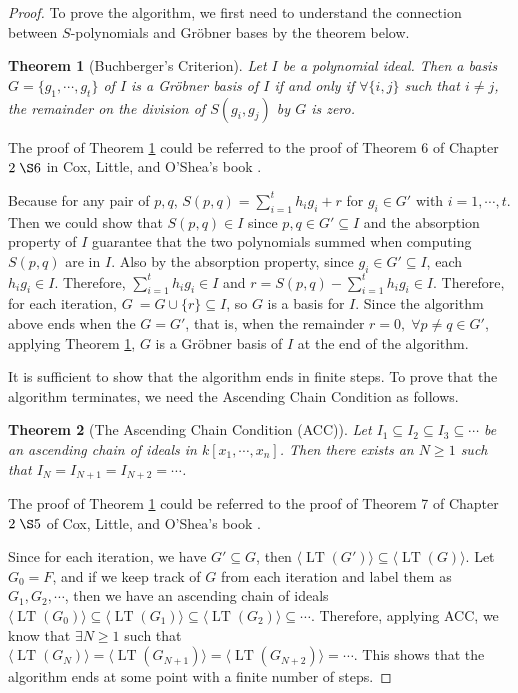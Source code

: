 \documentclass{article}
\newtheorem{theorem}{Theorem}[section]
\newcommand{\lt}{\ensuremath{\operatorname{LT}}}
\theoremstyle{definition}
\theoremstyle{remark}
\theoremstyle{example}
\begin{document}
\begin{proof}

To prove the algorithm, we first need to understand the connection between $S$-polynomials and Gröbner bases by the theorem below.

\begin{theorem}[Buchberger's Criterion]\label{thm:buchCriter}
    Let $I$ be a polynomial ideal. Then a basis $G = \{g_1, \cdots, g_t\}$ of $I$ is a Gröbner basis of $I$ if and only if $\forall \{i,j\}$ such that $i \neq j$, the remainder on the division of $S(g_i,g_j)$ by $G$ is zero.
\end{theorem}

The proof of Theorem \ref{thm:buchCriter} could be referred to the proof of Theorem 6 of Chapter $2 \;\S6$ in Cox, Little, and O'Shea's book \cite{cox_grobner_2015}. 

Because for any pair of $p,q$, $S(p,q) = \sum_{i = 1}^{t}{h_ig_i} + r$ for $g_i \in G'$ with $i = 1, \cdots, t$. Then we could show that $S(p,q) \in I$ since $p,q \in G' \subseteq I$ and the absorption property of $I$ guarantee that the two polynomials summed when computing $S(p,q)$ are in $I$. Also by the absorption property, since $g_i \in G' \subseteq I$, each $h_ig_i \in I$. Therefore, $\sum_{i = 1}^{t}{h_ig_i} \in I$ and $r = S(p,q) -  \sum_{i = 1}^{t}{h_ig_i} \in I$. Therefore, for each iteration, $G\:=G\cup\{r\} \subseteq I$, so $G$ is a basis for $I$. Since the algorithm above ends when the $G = G'$, that is, when the remainder $r = 0, \; \forall p \neq q \in G'$, applying Theorem \ref{thm:buchCriter}, $G$ is a Gröbner basis of $I$ at the end of the algorithm.

It is sufficient to show that the algorithm ends in finite steps. To prove that the algorithm terminates, we need the Ascending Chain Condition as follows.

\begin{theorem}[The Ascending Chain Condition (ACC)]
    Let $I_1 \subseteq I_2 \subseteq I_3 \subseteq \cdots$ be an ascending chain of ideals in $k[x_1, \cdots, x_n]$. Then there exists an $N \geq 1$ such that $I_{N} = I_{N+1} = I_{N+2} = \cdots$.
\end{theorem}

The proof of Theorem \ref{thm:buchCriter} could be referred to the proof of Theorem 7 of Chapter $2 \;\S5$ of Cox, Little, and O'Shea's book \cite{cox_grobner_2015}. 

Since for each iteration, we have $G' \subseteq G$, then $\langle \lt(G') \rangle \subseteq \langle \lt(G) \rangle$. Let $G_0 = F$, and if we keep track of $G$ from each iteration and label them as $G_1, G_2, \cdots$, then we have an ascending chain of ideals $\langle \lt(G_0) \rangle \subseteq \langle \lt(G_1) \rangle \subseteq \langle \lt(G_2) \rangle \subseteq \cdots$. Therefore, applying ACC, we know that $\exists N \geq 1$ such that $\langle \lt(G_{N}) \rangle = \langle \lt(G_{N+1}) \rangle = \langle \lt(G_{N+2}) \rangle = \cdots$. This shows that the algorithm ends at some point with a finite number of steps.
\end{proof}
\end{document}
